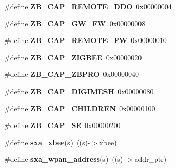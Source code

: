 \begin{DoxyCompactItemize}
\item 
\hypertarget{group___s_x_a_ga2c7a5cf548a644f0ffb85e45138f60f3}{\#define {\bfseries Z\-B\-\_\-\-C\-A\-P\-\_\-\-R\-E\-M\-O\-T\-E\-\_\-\-D\-D\-O}~0x00000004}\label{group___s_x_a_ga2c7a5cf548a644f0ffb85e45138f60f3}

\item 
\hypertarget{group___s_x_a_gadf32af1981087015b41e8d701d8d2f10}{\#define {\bfseries Z\-B\-\_\-\-C\-A\-P\-\_\-\-G\-W\-\_\-\-F\-W}~0x00000008}\label{group___s_x_a_gadf32af1981087015b41e8d701d8d2f10}

\item 
\hypertarget{group___s_x_a_ga7615b11eb71c25970e03e108523c3ded}{\#define {\bfseries Z\-B\-\_\-\-C\-A\-P\-\_\-\-R\-E\-M\-O\-T\-E\-\_\-\-F\-W}~0x00000010}\label{group___s_x_a_ga7615b11eb71c25970e03e108523c3ded}

\item 
\hypertarget{group___s_x_a_ga5293bd87697d34089625bfcc772312be}{\#define {\bfseries Z\-B\-\_\-\-C\-A\-P\-\_\-\-Z\-I\-G\-B\-E\-E}~0x00000020}\label{group___s_x_a_ga5293bd87697d34089625bfcc772312be}

\item 
\hypertarget{group___s_x_a_ga32d4e77a012a752e5ea1b736cdcadd10}{\#define {\bfseries Z\-B\-\_\-\-C\-A\-P\-\_\-\-Z\-B\-P\-R\-O}~0x00000040}\label{group___s_x_a_ga32d4e77a012a752e5ea1b736cdcadd10}

\item 
\hypertarget{group___s_x_a_ga00fdeef09968d5bc40cf7200494a09b4}{\#define {\bfseries Z\-B\-\_\-\-C\-A\-P\-\_\-\-D\-I\-G\-I\-M\-E\-S\-H}~0x00000080}\label{group___s_x_a_ga00fdeef09968d5bc40cf7200494a09b4}

\item 
\hypertarget{group___s_x_a_ga0cced2faadc2f7350d02728629abf0a3}{\#define {\bfseries Z\-B\-\_\-\-C\-A\-P\-\_\-\-C\-H\-I\-L\-D\-R\-E\-N}~0x00000100}\label{group___s_x_a_ga0cced2faadc2f7350d02728629abf0a3}

\item 
\hypertarget{group___s_x_a_ga45291623ecceaded53004da1c2293150}{\#define {\bfseries Z\-B\-\_\-\-C\-A\-P\-\_\-\-S\-E}~0x00000200}\label{group___s_x_a_ga45291623ecceaded53004da1c2293150}

\item 
\hypertarget{group___s_x_a_gac382904e58cb18272c185f902e1f527d}{\#define {\bfseries sxa\-\_\-xbee}(s)~((s)-\/$>$xbee)}\label{group___s_x_a_gac382904e58cb18272c185f902e1f527d}

\item 
\hypertarget{group___s_x_a_ga69ad5cef9cec5623f2c88e37e3af6ce0}{\#define {\bfseries sxa\-\_\-wpan\-\_\-address}(s)~((s)-\/$>$addr\-\_\-ptr)}\label{group___s_x_a_ga69ad5cef9cec5623f2c88e37e3af6ce0}


\end{DoxyCompactItemize}
